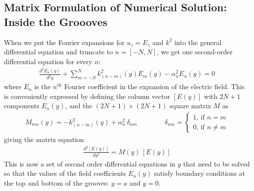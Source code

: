 \subsection{Matrix Formulation of Numerical Solution: Inside the Groooves}
When we put the Fourier expansions for $u_z = E_z$  and $k^2$  into the general differential equation  and truncate to $n=[-N, N]$, we get one second-order differential equation for every $n$:
\begin{align}
\frac{d^2 E_n(y)}{d^2y} + \sum \limits_{m=-N}^{N} k^2_{(n-m)}(y) E_m(y) - \alpha_n^2 E_n(y) = 0
\end{align}
where $E_n$ is the $n^\textrm{th}$ Fourier coefficient in the expansion of the electric field.  This is conveniently expressed by defining the column vector $\left[E(y)\right]$ with $2N+1$ components $E_n(y)$, and the $(2N+1)\times(2N+1)$ square matrix $M$ as
\begin{align}
M_{nm}(y) = -k^2_{(n-m)}(y) + \alpha^2_n \,\delta_{nm}  \qquad \qquad \delta_{nm} = \left\{ \begin{array}{c}1 \textrm{, if } n=m \\0 \textrm{, if } n\neq m\end{array}\right.
\end{align}
giving the matrix equation
\begin{align}
\label{matrixDE}
\frac{d^2 \left[E(y)\right]}{dy^2} = M(y) \, \left[E(y)\right]
\end{align}
This is now a set of second order differential equations in $y$ that need to be solved so that the values of the field coefficients $E_n(y)$ satisfy boundary conditions at the top and bottom of the grooves: $y=a$ and $y=0$.
